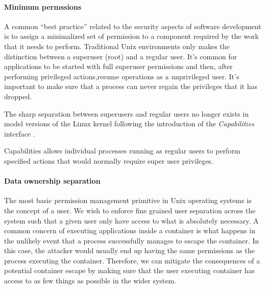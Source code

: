 \paragraph{Minimum permssions}
\label{sec:cap}

A common "`best practice"' related to the security aspects of software
development is to assign a minimalized set of permission to a
component required by the work that it needs to perform. Traditional
Unix environments only makes the distinction between a superuser
(root) and a regular user. It's common for applications to be started
with full superuser permissions and then, after performing privileged
actions,resume operations as a unprivileged user. It's important to
make sure that a process can never regain the privileges that it has
dropped.


The sharp separation between superusers and regular users no longer
exists in model versions of the Linux kernel following the
introduction of the \textit{Capabilities} interface \cite{cap7}. 

Capabilities allows individual processes running as regular users to
perform specified actions that would normally require super user
privileges.

\paragraph{Data ownership separation}
The most basic permission management primitive in Unix operating
systems is the concept of a user. We wish to enforce fine grained user
separation across the system such that a given user only have access
to what is absolutely necessary. A common concern of executing
applications inside a container is what happens in the unlikely event
that a process successfully manages to escape the container. In this
case, the attacker would usually end up having the same permissions as
the process executing the container. Therefore, we can mitigate the
consequences of a potential container escape by making sure that the
user executing container has access to as few things as possible in
the wider system.


